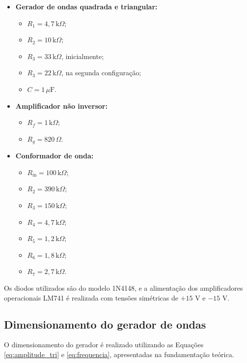 \documentclass[11pt,a4paper]{article}
\begin{document}
\begin{itemize}

    \item \textbf{Gerador de ondas quadrada e triangular:}
    \begin{itemize}
        \item $R_1=4,7\,\text{k}\Omega$;
        \item $R_2=10\,\text{k}\Omega$;
        \item $R_3=33\,\text{k}\Omega$, inicialmente;
        \item $R_3=22\,\text{k}\Omega$, na segunda configuração;
        \item $C=1\,\mu\text{F}$.
    \end{itemize}

    \item \textbf{Amplificador não inversor:}
    \begin{itemize}
        \item $R_f=1\,\text{k}\Omega$;
        \item $R_g=820\,\Omega$.
    \end{itemize}

    \item \textbf{Conformador de onda:}
    \begin{itemize}
        \item $R_{\text{in}}=100\,\text{k}\Omega$;
        \item $R_2=390\,\text{k}\Omega$;
        \item $R_3=150\,\text{k}\Omega$;
        \item $R_4=4,7\,\text{k}\Omega$;
        \item $R_5=1,2\,\text{k}\Omega$;
        \item $R_6=1,8\,\text{k}\Omega$;
        \item $R_7=2,7\,\text{k}\Omega$.
    \end{itemize}

\end{itemize}

Os diodos utilizados são do modelo 1N4148, e a alimentação dos amplificadores operacionais LM741 é realizada com tensões simétricas de $+15$ V e $-15$ V.

\subsection{Dimensionamento do gerador de ondas}

O dimensionamento do gerador é realizado utilizando as Equações \ref{eq:amplitude_tri} e \ref{eq:frequencia}, apresentadas na fundamentação teórica.
\end{document}
